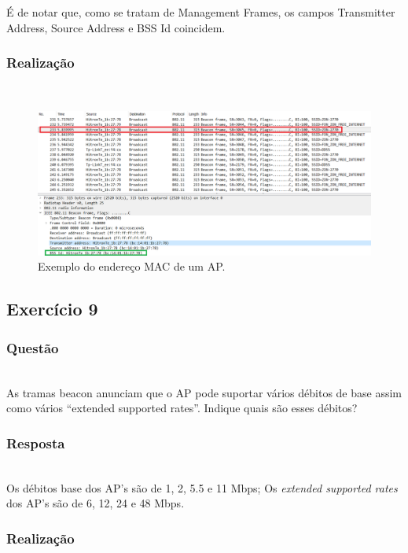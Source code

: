 \documentclass{llncs}
\begin{document}
É de notar que, como se tratam de Management Frames, os campos Transmitter Address, Source Address e BSS Id coincidem.

\subsubsection{Realização}\rule[-10pt]{0pt}{10pt}\\

\begin{figure}
  \begin{center}
  \includegraphics[scale=0.35]{imagens/beacon_MAC.png} 
  \end{center}
  \caption{Exemplo do endereço MAC de um AP.}
  \label{fig:beacon_mac}
\end{figure}


\clearpage
\subsection{Exercício 9}
\subsubsection{Questão}\rule[-10pt]{0pt}{10pt}\\

As tramas beacon anunciam que o AP pode suportar vários débitos de base assim como vários “extended supported rates”. Indique quais são esses débitos?

\subsubsection{Resposta}\rule[-10pt]{0pt}{10pt}\\

Os débitos base dos AP's são de 1, 2, 5.5 e 11 Mbps; Os \textit{extended supported rates} dos AP's são de 6, 12, 24 e 48 Mbps.

\subsubsection{Realização}\rule[-10pt]{0pt}{10pt}\\
\end{document}
